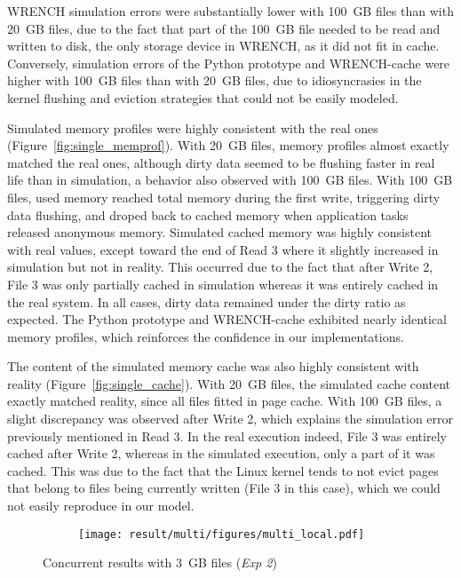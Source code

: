\documentclass[conference]{IEEEtran}
\newcommand{\wrench}{WRENCH\xspace}
\begin{document}
        \wrench simulation errors were substantially lower with 100~GB
        files than with 20~GB files, due to the fact that part of the
        100~GB file needed to be read and written to disk, the only storage
        device in \wrench, as it did not fit in cache. Conversely,
        simulation errors of the Python prototype and \wrench-cache were higher with
        100~GB files than with 20~GB files, due to idiosyncrasies in the kernel
        flushing and eviction strategies that could not be easily modeled.

        Simulated memory profiles were highly consistent with the real ones
        (Figure~\ref{fig:single_memprof}). With 20~GB files, memory profiles almost exactly matched the
        real ones, although dirty data seemed to be flushing faster in real
        life than in simulation, a behavior also
        observed with 100~GB files. With 100~GB files, used memory reached
        total memory during the first write, triggering dirty data
        flushing, and droped back to cached memory when application tasks
        released anonymous memory. Simulated cached memory was highly
        consistent with real values, except toward the end of Read 3 where
        it slightly increased in simulation but not in reality. This
        occurred due to the fact that after Write 2, File 3 was only partially
        cached in simulation whereas it was entirely cached in the real
        system. In all cases, dirty data remained under the dirty ratio as
        expected. The Python prototype and \wrench-cache exhibited nearly
        identical memory profiles, which reinforces the confidence in our
        implementations.

        The content of the simulated memory cache was also highly
        consistent with reality (Figure~\ref{fig:single_cache}). With 20~GB
        files, the simulated cache content exactly matched reality, since
        all files fitted in page cache. With 100~GB files, a slight
        discrepancy was observed after Write 2, which explains the
        simulation error previously mentioned in Read 3. In the real
        execution indeed, File 3 was entirely cached after Write 2, whereas
        in the simulated execution, only a part of it was cached. This was
        due to the fact that the Linux kernel tends to not evict pages that
        belong to files being currently written (File 3 in this case),
        which we could not easily reproduce in our model.

            \begin{figure*}
                \begin{subfigure}{\linewidth}
                    \centering
                    \texttt{[image: result/multi/figures/multi\_local.pdf]}
                \end{subfigure}
                \caption{Concurrent results with 3~GB files (\textit{Exp 2})}
                \label{fig:multi_local}
            \end{figure*}
\end{document}

